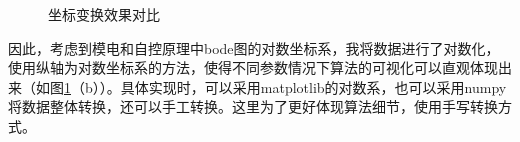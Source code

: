 \documentclass[lang=cn,11pt]{elegantpaper}
\begin{document}
\begin{figure}[ht]
\centering    %
\caption{坐标变换效果对比} %
\label{fig:坐标变换效果对比}  %
\end{figure}

因此，考虑到模电和自控原理中bode图的对数坐标系，我将数据进行了对数化，使用纵轴为对数坐标系的方法，使得不同参数情况下算法的可视化可以直观体现出来（如图\ref{fig:坐标变换效果对比}（b））。具体实现时，可以采用matplotlib的对数系，也可以采用numpy将数据整体转换，还可以手工转换。这里为了更好体现算法细节，使用手写转换方式。
\end{document}
